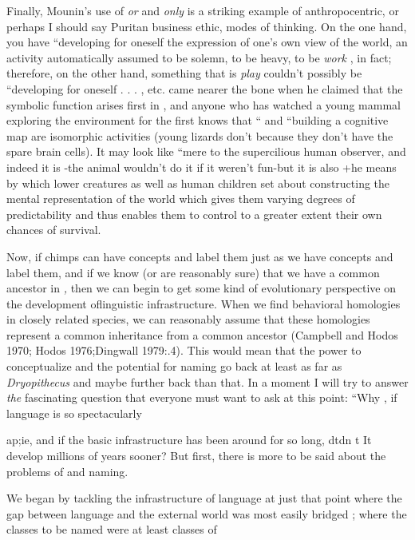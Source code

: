 Finally, Mounin's use of \textit{or} and \textit{only} is a striking example of anthropocentric, or perhaps I should say Puritan business ethic, modes of thinking. On the one hand, you have ``developing for oneself the expression of one's own view of the world, an activity automatically assumed to be solemn, to be heavy, to be \textit{work} , in fact; therefore, on the other hand, something that is \textit{play} couldn't possibly be ``de\-veloping for oneself . . . , etc. \citet{Piaget1962} came nearer the bone when he claimed that the symbolic function arises first in , and anyone who has watched a young mammal exploring the environment for the first  knows that `` and ``building a cognitive map are isomorphic activities (young lizards don't  because they don't have the spare brain cells). It may look like ``mere  to the super\-cilious human observer, and indeed it is -the animal wouldn't do it if it weren't fun-but it is also +he means by which lower creatures
as well as human children set about constructing the mental representa\-tion of the world which gives them varying degrees of predictability
and thus enables them to control to a greater extent their own chances of survival.

Now, if chimps can have concepts and label them just as we have concepts and label them, and if we know (or are reasonably sure) that we have a common ancestor in \textit{,} then we can begin to get some kind of evolutionary perspective on the development oflinguistic infrastructure. When we find behavioral homologies in closely related species, we can reasonably assume that these homologies represent a common inheritance from a common ancestor (Campbell and Hodos 1970; Hodos 1976;Dingwall 1979:.4). This would mean that the power to conceptualize and the potential for naming go back at least as far as \textit{Dryopithecus} and maybe further back than that. In a moment I will try to answer \textit{the} fascinating question that everyone must want to ask at this point: ``Why , if language is so spectacularly

ap;ie, and if the basic infrastructure has been around for so long, dtdn t It develop millions of years sooner? But first, there is more to be said about the problems of  and naming.

We began by tackling the infrastructure of language at just that point where the gap between language and the external world was most easily bridged ; where the classes to be named were at least classes of

